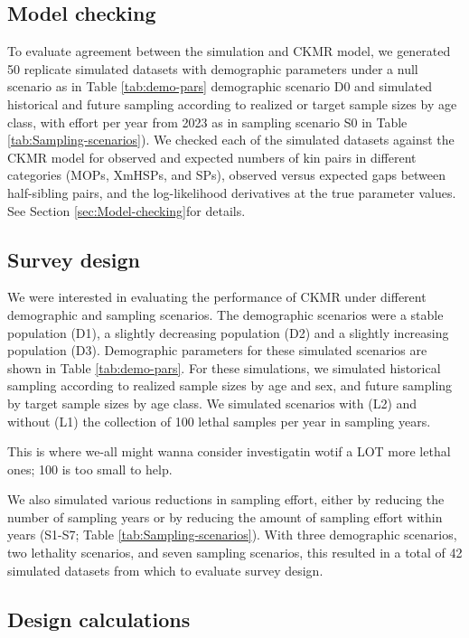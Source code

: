 \subsection{Model checking}

To evaluate agreement between the simulation and CKMR model, we generated
50 replicate simulated datasets with demographic parameters under
a null scenario as in Table \ref{tab:demo-pars} demographic scenario
D0 and simulated historical and future sampling according to realized
or target sample sizes by age class, with effort per year from 2023
as in sampling scenario S0 in Table \ref{tab:Sampling-scenarios}).
We checked each of the simulated datasets against the CKMR model for
observed and expected numbers of kin pairs in different categories
(MOPs, XmHSPs, and SPs), observed versus expected gaps between half-sibling
pairs, and the log-likelihood derivatives at the true parameter values.
See Section \ref{sec:Model-checking}for details.

\subsection{Survey design}

We were interested in evaluating the performance of CKMR under different
demographic and sampling scenarios. The demographic scenarios were
a stable population (D1), a slightly decreasing population (D2) and
a slightly increasing population (D3). Demographic parameters for
these simulated scenarios are shown in Table \ref{tab:demo-pars}.
For these simulations, we simulated historical sampling according
to realized sample sizes by age and sex, and future sampling by target
sample sizes by age class. We simulated scenarios with (L2) and without
(L1) the collection of 100 lethal samples per year in sampling years.%
\begin{lyxgreyedout}
This is where we-all might wanna consider investigatin wotif a LOT
more lethal ones; 100 is too small to help.%
\end{lyxgreyedout}
{} We also simulated various reductions in sampling effort, either by
reducing the number of sampling years or by reducing the amount of
sampling effort within years (S1-S7; Table \ref{tab:Sampling-scenarios}).
With three demographic scenarios, two lethality scenarios, and seven
sampling scenarios, this resulted in a total of 42 simulated datasets
from which to evaluate survey design.

\subsection{Design calculations}

